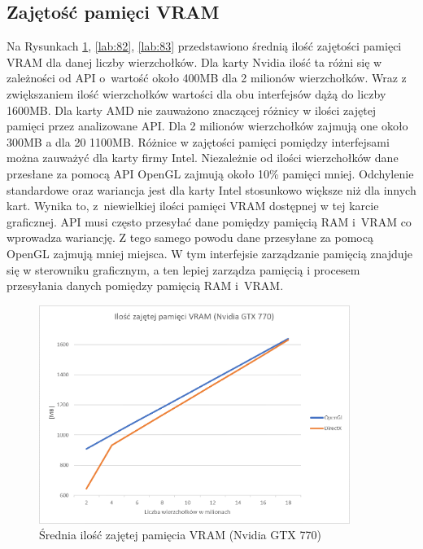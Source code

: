 \documentclass[archive]{mgr}
\begin{document}
\newpage

\subsection{Zajętość pamięci VRAM}

Na Rysunkach \ref{lab:81}, \ref{lab:82}, \ref{lab:83} przedstawiono średnią ilość zajętości pamięci VRAM dla danej liczby wierzchołków. Dla karty Nvidia ilość ta różni się w zależności od API o~wartość około 400MB dla 2 milionów wierzchołków. Wraz z zwiększaniem ilość wierzchołków wartości dla obu interfejsów dążą do liczby 1600MB. Dla karty AMD nie zauważono znaczącej różnicy w ilości zajętej pamięci przez analizowane API. Dla 2 milionów wierzchołków zajmują one około 300MB a dla 20 1100MB. Różnice w zajętości pamięci pomiędzy interfejsami można zauważyć dla karty firmy Intel. Niezależnie od ilości wierzchołków dane przesłane za pomocą API OpenGL zajmują około 10\% pamięci mniej. Odchylenie standardowe oraz wariancja jest dla karty Intel stosunkowo większe niż dla innych kart. Wynika to, z~niewielkiej ilości pamięci VRAM dostępnej w tej karcie graficznej. API musi często przesyłać dane pomiędzy pamięcią RAM i~VRAM co wprowadza wariancję. Z tego samego powodu dane przesyłane za pomocą OpenGL zajmują mniej miejsca. W tym interfejsie zarządzanie pamięcią znajduje się w sterowniku graficznym, a ten lepiej zarządza pamięcią i procesem przesyłania danych pomiędzy pamięcią RAM i~VRAM.




\begin{figure}[h!]
  \centering
    \includegraphics[width=0.9\textwidth]{images/vram/1.png}
   \caption{Średnia ilość zajętej pamięcia VRAM (Nvidia GTX 770)}
   \label{lab:81}
\end{figure}
\newpage
\end{document}

